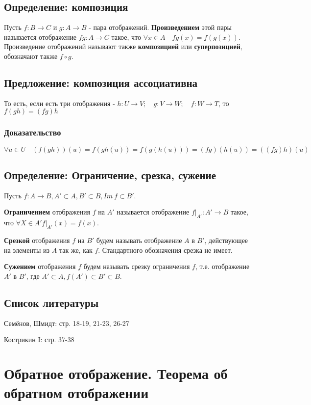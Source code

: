\documentclass{article}
\begin{document}
\subsection{Определение: композиция}
Пусть $f: B \rightarrow C$ и $g: A \rightarrow B$ - пара отображений. \textbf{Произведением} этой пары называется отображение $fg: A \rightarrow C$ такое, что $\forall x \in A \quad fg(x) = f(g(x))$. Произведение отображений называют также \textbf{композицией} или \textbf{суперпозицией}, обозначают также $f \circ g$.

\subsection{Предложение: композиция ассоциативна}
То есть, если есть три отображения - $
	h: U \rightarrow V; \quad
	g: V \rightarrow W; \quad
	f: W \rightarrow T
$, то ${f(gh) = (fg)h}$

\subsubsection*{Доказательство}
\[
	\forall u \in U \quad (f(gh))(u) = f(gh(u)) = f(g(h(u))) = (fg)(h(u)) = ((fg)h)(u)
\]

\subsection{Определение: Ограничение, срезка, сужение}
Пусть $f: A \rightarrow B, A' \subset A, B' \subset B, Im~f \subset B'$.

\textbf{Ограничением} отображения $f$ на $A'$ называется отображение ${f|}_{A'}: A' \rightarrow B$ такое, что $\forall X \in A' {f|}_{A'}(x) = f(x)$.

\textbf{Срезкой} отображения $f$ на $B'$ будем называть отображение $A$ в $B'$, действующее на элементы из $A$ так же, как $f$. Стандартного обозначения срезка не имеет.

\textbf{Сужением} отображения $f$ будем называть срезку ограничения $f$, т.е. отображение $A'$ в $B'$, где $A' \subset A, f(A') \subset B' \subset B$.

\subsection{Список литературы}

Семёнов, Шмидт: стр. 18-19, 21-23, 26-27

Кострикин I: стр. 37-38


\newpage
\section{Обратное отображение. Теорема об обратном отображении}
\end{document}
